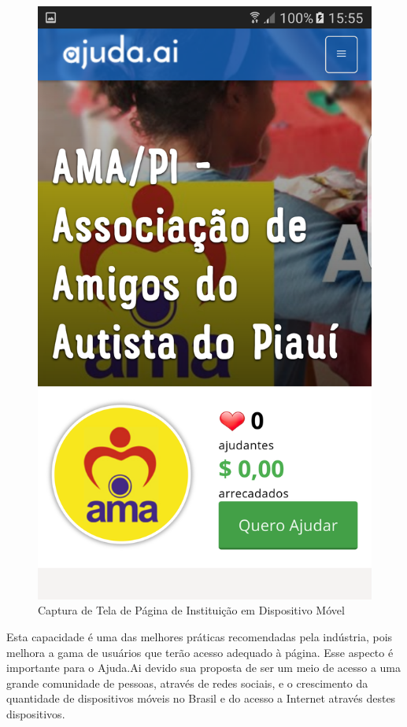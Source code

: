 \begin{figure}[H]
\begin{minipage}{0.4\textwidth}
    \centering
    \caption{Captura de Tela de Página de Instituição em Dispositivo Móvel}
    \label{fig:ss_ajudaai_06}
    \includegraphics[scale=0.12]{imagens/screenshot-ajudaai-06.png}
  \end{minipage}
\end{figure}

Esta capacidade é uma das melhores práticas recomendadas pela indústria, pois melhora a gama de usuários que terão acesso adequado à página. Esse aspecto é importante para o Ajuda.Ai devido sua proposta de ser um meio de acesso a uma grande comunidade de pessoas, através de redes sociais, e o crescimento da quantidade de dispositivos móveis no Brasil e do acesso a Internet através destes dispositivos.

